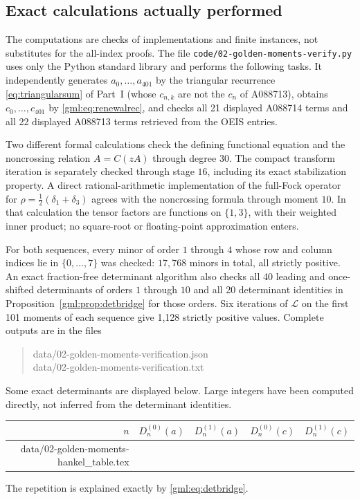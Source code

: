 \documentclass[11pt]{article}
\makeatletter
\numberwithin{equation}{section}
\theoremstyle{definition}
\theoremstyle{remark}
\newcommand{\LL}{\mathcal L}
\newcommand{\tableinput}[1]{\@@input #1 }
\makeatother
\begin{document}
\subsection{Exact calculations actually performed}
The computations are checks of implementations and finite instances, not
substitutes for the all-index proofs. The file \texttt{code/02-golden-moments-verify.py}
uses only the Python standard library and performs the following tasks.
It independently generates $a_0,\ldots,a_{401}$ by the triangular recurrence
\eqref{eq:triangularsum} of Part~I (whose $c_{n,k}$ are not the $c_n$ of
A088713), obtains $c_0,\ldots,c_{401}$ by
\eqref{gml:eq:renewalrec}, and checks all 21 displayed A088714 terms and all
22 displayed A088713 terms retrieved from the OEIS entries.

Two different formal calculations check the defining functional equation
and the noncrossing relation $A=C(zA)$ through degree $30$.
The compact transform iteration is separately checked through stage $16$,
including its exact stabilization property. A direct rational-arithmetic
implementation of the full-Fock operator for
$\rho=\tfrac12(\delta_1+\delta_3)$ agrees with the noncrossing formula
through moment $10$. In that calculation the tensor factors are functions
on $\{1,3\}$, with their weighted inner product; no square-root or
floating-point approximation enters.

For both sequences, every minor of order $1$ through $4$ whose row and
column indices lie in $\{0,\ldots,7\}$ was checked: $17{,}768$ minors in
total, all strictly positive. An exact fraction-free determinant algorithm
also checks all 40 leading and once-shifted determinants of orders $1$
through $10$ and all 20 determinant identities in
Proposition~\ref{gml:prop:detbridge} for those orders. Six iterations of
$\LL$ on the first 101 moments of each sequence give 1,128 strictly
positive values. Complete outputs are in the files
\begin{quote}\ttfamily\small
data/02-golden-moments-verification.json\\
data/02-golden-moments-verification.txt
\end{quote}

Some exact determinants are displayed below. Large integers have been
computed directly, not inferred from the determinant identities.
\begin{center}
\small
\setlength{\tabcolsep}{4pt}
\begin{tabular}{r|rrrr}
\toprule
$n$&$D_n^{(0)}(a)$&$D_n^{(1)}(a)$&$D_n^{(0)}(c)$&$D_n^{(1)}(c)$\\
\midrule
\tableinput{data/02-golden-moments-hankel_table.tex}
\bottomrule
\end{tabular}
\end{center}
The repetition is explained exactly by \eqref{gml:eq:detbridge}.
\end{document}
